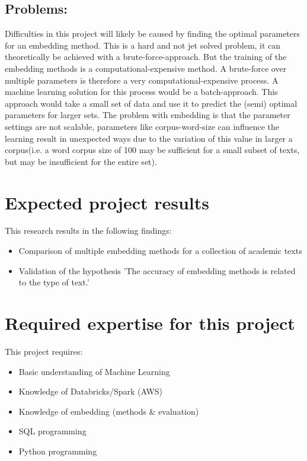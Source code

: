 \documentclass[10pt,a4paper]{article}
\begin{document}
\subsection{Problems:}
Difficulties in this project will likely be caused by finding the optimal parameters for an embedding method. This is a hard and not jet solved problem, it can theoretically be achieved with a brute-force-approach. But the training of the embedding methods is a computational-expensive method. A brute-force over multiple parameters is therefore a very computational-expensive process. A machine learning solution for this process would be a batch-approach. This approach would take a small set of data and use it to predict the (semi) optimal parameters for larger sets. The problem with embedding is that the parameter settings are not scalable, parameters like corpus-word-size can influence the learning result in unexpected ways due to the variation of this value in larger a corpus(i.e. a word corpus size of 100 may be sufficient for a small subset of texts, but may be insufficient for the entire set).


\section{Expected project results}
This research results in the following findings:
\begin{itemize}
\item{Comparison of multiple embedding methods for a collection of academic texts}
\item{Validation of the hypothesis 'The accuracy of embedding methods is related to the type of text.'}
\end{itemize}
\section{Required expertise for this project}
This project requires:
\begin{itemize}
\item{Basic understanding of Machine Learning}
\item{Knowledge of Databricks/Spark (AWS)}
\item{Knowledge of embedding (methods \& evaluation)}
\item{SQL programming}
\item{Python programming}
\end{itemize}
\end{document}
